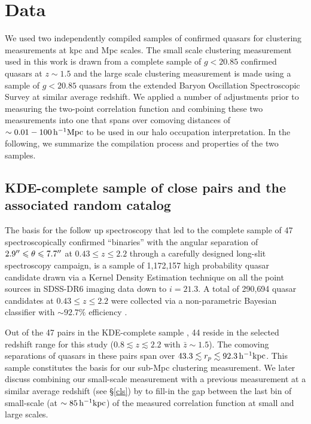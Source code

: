 \documentclass[useAMS,usenatbib]{mn2e}
\begin{document}
\section{Data}\label{dat}
 We used two independently compiled samples of confirmed quasars for clustering 
measurements at kpc and Mpc scales. The small scale clustering measurement used in this work is drawn from a complete sample of 
$g<20.85$ confirmed quasars at $z \sim 1.5$ and the large scale clustering measurement is 
made using a sample of $g<20.85$ quasars from the extended Baryon 
Oscillation Spectroscopic Survey \citep[eBOSS;][]{daw16} at similar average redshift. We applied a number of adjustments prior to measuring the two-point correlation function and combining these two measurements into one that spans over comoving distances of $\sim 0.01-100 \, \rm h^{-1}Mpc$ to be used in our halo occupation interpretation. In the following, we summarize the compilation process and properties of the two samples.

\subsection{KDE-complete sample of close pairs and the associated random catalog}\label{sdat}
The basis for the follow up spectroscopy that led to the complete sample of 47 spectroscopically confirmed ``binaries'' with the angular separation of $2.9\arcsec \leq \theta \leq 7.7\arcsec$ at $0.43 \leq z \leq 2.2$ through a carefully designed long-slit spectroscopy campaign, is a sample of 1{,}172{,}157 high probability quasar candidate drawn via a Kernel Density Estimation technique \citep[KDE;][]{ric04} on all the point sources in SDSS-DR6\citep[][]{admc08} imaging data down to $i=21.3$. A total of 290{,}694 quasar candidates at $0.43 \leq z \leq 2.2$ were collected via a non-parametric Bayesian classifier with $\sim 92.7\%$ efficiency \citep[see ][and references therein for detail]{ef17}. 

Out of the 47 pairs in the KDE-complete sample \citep[presented in Figure 4 and Table 5 of][]{ef17}, 44 reside in the selected redshift range for this study ($0.8 \lesssim z \lesssim 2.2$ with $\bar z\sim 1.5$). The comoving separations of quasars in these pairs span over $43.3 \lesssim r_p \lesssim 92.3 \, \rm h^{-1}kpc$. This sample constitutes the basis for our sub-Mpc clustering measurement. We later discuss combining our small-scale measurement with a previous measurement at a similar average redshift (see \S\ref{cls}) by \citet{ko12} to fill-in the gap between the last bin of small-scale (at $\sim 85 \, \rm h^{-1}kpc$) of the measured correlation function at small and large scales. 
\end{document}
